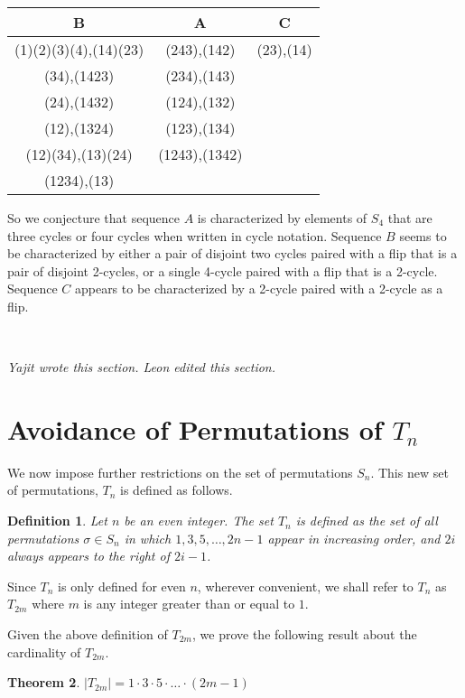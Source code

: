 \documentclass[11pt,letterpaper,twoside,english]{article}
\theoremstyle{theorem}
\newtheorem{theorem}{Theorem}[section]
\newtheorem{definition}[theorem]{Definition}
\theoremstyle{remark}
\begin{document}
\begin{center}
\begin{tabular}{|c|c|c|}
B &A&C\\
\hline
(1)(2)(3)(4),(14)(23)&(243),(142)&(23),(14)\\
(34),(1423)&(234),(143)&\\
(24),(1432)&(124),(132)&\\
(12),(1324)&(123),(134)&\\
(12)(34),(13)(24)&(1243),(1342)&\\
(1234),(13)&&\\
\end{tabular}
\end{center}

So we conjecture that sequence $A$ is characterized by elements of $S_4$ that are three cycles or four cycles when written in cycle notation. Sequence $B$ seems to be characterized by either a pair of disjoint two cycles paired with a flip that is a pair of disjoint 2-cycles, or a single 4-cycle paired with a flip that is a 2-cycle. Sequence $C$ appears to be characterized by a 2-cycle paired with a 2-cycle as a flip. 

\

\emph{Yajit wrote this section. Leon edited this section.}

\section{Avoidance of Permutations of $T_n$}
\label{Tn}
We now impose further restrictions on the set of permutations $S_n$. This new set of permutations, $T_n$ is defined as follows.

\begin{definition}
Let $n$ be an even integer. The set $T_n$ is defined as the set of all permutations $\sigma \in S_n$ in which $1,3,5,\ldots,2n-1$ appear in increasing order, and $2i$ always appears to the right of $2i-1$.
\end{definition}

Since $T_n$ is only defined for even $n$, wherever convenient, we shall refer to $T_n$ as $T_{2m}$ where $m$ is any integer greater than or equal to $1$.

Given the above definition of $T_{2m}$, we prove the following result about the cardinality of $T_{2m}$.

\begin{theorem}
$|T_{2m}| = 1 \cdot 3 \cdot 5 \cdot \ldots \cdot (2m-1)$
\end{theorem}
\end{document}
